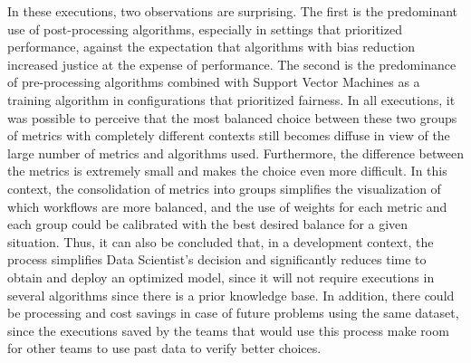 \documentclass[10pt,conference]{IEEEtran}
\begin{document}
In these executions, two observations are surprising. The first is the predominant use of post-processing algorithms, especially in settings that prioritized performance, against the expectation that algorithms with bias reduction increased justice at the expense of performance. The second is the predominance of pre-processing algorithms combined with Support Vector Machines as a training algorithm in configurations that prioritized fairness.
In all executions, it was possible to perceive that the most balanced choice between these two groups of metrics with completely different contexts still becomes diffuse in view of the large number of metrics and algorithms used. Furthermore, the difference between the metrics is extremely small and makes the choice even more difficult. In this context, the consolidation of metrics into groups simplifies the visualization of which workflows are more balanced, and the use of weights for each metric and each group could be calibrated with the best desired balance for a given situation. Thus, it can also be concluded that, in a development context, the process simplifies Data Scientist's decision and significantly reduces time to obtain and deploy an optimized model, since it will not require executions in several algorithms since there is a prior knowledge base. In addition, there could be processing and cost savings in case of future problems using the same dataset, since the executions saved by the teams that would use this process make room for other teams to use past data to verify better choices.

\begin{table}[H]
\begin{center}
  \caption{Top options chosen by Autonomic Manager \\ 50\% Performance/50\% Fairness}
\label{tbl:ScoreMAPEKOverall5050}
\end{center}
\end{table}
\end{document}
